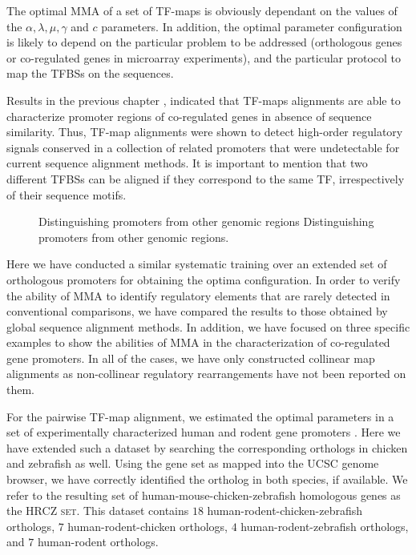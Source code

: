 
The optimal MMA of a set of TF-maps is obviously dependant on the
values of the $\alpha, \lambda, \mu, \gamma$ and $c$ parameters. In addition,
the optimal parameter configuration is likely to depend on the particular
problem to be addressed (orthologous genes or co-regulated genes in microarray
experiments), and the particular protocol to map the TFBSs on the sequences.

Results in the previous chapter \citep{blanco:2006b}, indicated that TF-maps
alignments are able to characterize promoter regions of co-regulated genes
in absence of sequence similarity. Thus, TF-map alignments were shown to
detect high-order regulatory signals conserved in a collection of
related promoters that were undetectable for current sequence alignment
methods. It is important to mention that two different TFBSs can
be aligned if they correspond to the same TF, irrespectively of their 
sequence motifs.

\begin{figure}[t!]
\begin{center}
\setlength{\fboxsep}{0pt}
          {Distinguishing promoters from other genomic regions}%
          {Distinguishing promoters from other genomic regions.}%
          {}
\end{center}
\end{figure}

Here we have conducted a similar systematic training over an extended set
of orthologous promoters for obtaining the optima configuration. In order
to verify the ability of MMA to identify regulatory elements that are
rarely detected in conventional comparisons, we have compared the results
to those obtained by global sequence alignment methods. In addition, we
have focused on three specific examples to show the abilities of MMA in the
characterization of co-regulated gene promoters. In all of the cases, we have 
only constructed collinear map alignments as non-collinear regulatory 
rearrangements have not been reported on them.


For the pairwise TF-map alignment, we estimated the optimal parameters
in a set of experimentally characterized human and rodent gene promoters
\citep{blanco:2006b}. Here we have extended such a dataset by searching
the corresponding orthologs in chicken and zebrafish as well. Using the
 \citep{pruitt:2005a} gene set as mapped into the UCSC genome browser,
we have correctly identified the ortholog in both species, if available.
We refer to the resulting set of human-mouse-chicken-zebrafish homologous 
genes as the \textsc{HRCZ set}. This dataset contains $18$
human-rodent-chicken-zebrafish orthologs, $7$ human-rodent-chicken orthologs,
$4$ human-rodent-zebrafish orthologs, and $7$ human-rodent orthologs.

